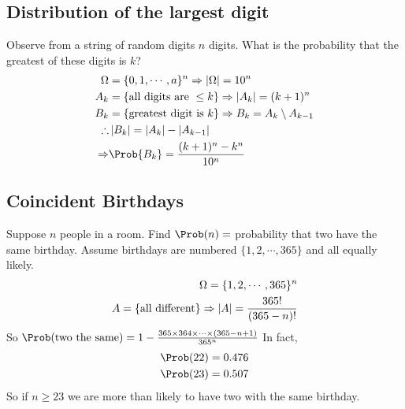\documentclass{article}
\numberwithin{equation}{section}
\begin{document}
\subsection{Distribution of the largest digit}
Observe from a string of random digits $n$ digits. What is the probability that the greatest of these digits is $k$?
\begin{align*}
    \Omega &= \{0, 1, \cdots, a\}^n  \Rightarrow \abs{\Omega} = 10^n\\
    A_k &= \{\text{all digits are } \leq k\}  \Rightarrow \abs{A_k} = (k+1)^n\\
    B_k &= \{\text{greatest digit is } k\} \Rightarrow B_k = A_k \setminus A_{k-1} \\
    \therefore& \abs{B_k} = \abs{A_k} - \abs{A_{k-1} } \\
    \Rightarrow& \Prob{B_k} = \frac{(k+1)^n - k^n}{10^n}
\end{align*}

\subsection{Coincident Birthdays}
Suppose $n$ people in a room. Find $\Prob(n) = $ probability that two have the same birthday.
Assume birthdays are numbered $\{1, 2, \cdots, 365\}$ and all equally likely.
\begin{align*}
    \Omega = \{1, 2, \cdots, 365\}^n \\
    A = \{\text{all different}\} \Rightarrow \left\lvert A\right\rvert = \frac{365!}{(365 - n)!}
\end{align*}
So $\Prob(\text{two the same}) = 1 - \frac{365 \times 364 \times \cdots \times (365 -n +1)}{365^n}$
In fact,
\begin{align*}
    \Prob(22) = 0.476 \\
    \Prob(23) = 0.507
\end{align*}
So if $n \geq 23$ we are more than likely to have two with the same birthday.
\end{document}
